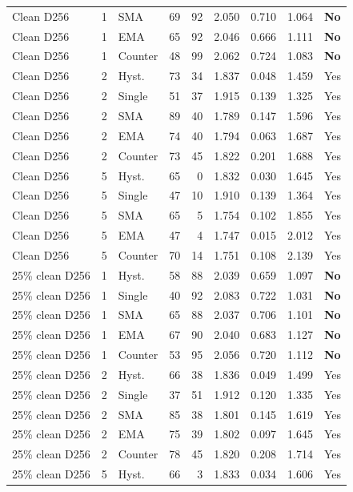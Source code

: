 {\begin{longtable}{lllrrrrrl}
Clean D256 & 1 & SMA & 69 & 92 & 2.050 & 0.710 & 1.064 & \textbf{No}\\
Clean D256 & 1 & EMA & 65 & 92 & 2.046 & 0.666 & 1.111 & \textbf{No}\\
Clean D256 & 1 & Counter & 48 & 99 & 2.062 & 0.724 & 1.083 & \textbf{No}\\
Clean D256 & 2 & Hyst. & 73 & 34 & 1.837 & 0.048 & 1.459 & Yes\\
Clean D256 & 2 & Single & 51 & 37 & 1.915 & 0.139 & 1.325 & Yes\\
Clean D256 & 2 & SMA & 89 & 40 & 1.789 & 0.147 & 1.596 & Yes\\
Clean D256 & 2 & EMA & 74 & 40 & 1.794 & 0.063 & 1.687 & Yes\\
Clean D256 & 2 & Counter & 73 & 45 & 1.822 & 0.201 & 1.688 & Yes\\
Clean D256 & 5 & Hyst. & 65 & 0 & 1.832 & 0.030 & 1.645 & Yes\\
Clean D256 & 5 & Single & 47 & 10 & 1.910 & 0.139 & 1.364 & Yes\\
Clean D256 & 5 & SMA & 65 & 5 & 1.754 & 0.102 & 1.855 & Yes\\
Clean D256 & 5 & EMA & 47 & 4 & 1.747 & 0.015 & 2.012 & Yes\\
Clean D256 & 5 & Counter & 70 & 14 & 1.751 & 0.108 & 2.139 & Yes\\
25\% clean D256 & 1 & Hyst. & 58 & 88 & 2.039 & 0.659 & 1.097 & \textbf{No}\\
25\% clean D256 & 1 & Single & 40 & 92 & 2.083 & 0.722 & 1.031 & \textbf{No}\\
25\% clean D256 & 1 & SMA & 65 & 88 & 2.037 & 0.706 & 1.101 & \textbf{No}\\
25\% clean D256 & 1 & EMA & 67 & 90 & 2.040 & 0.683 & 1.127 & \textbf{No}\\
25\% clean D256 & 1 & Counter & 53 & 95 & 2.056 & 0.720 & 1.112 & \textbf{No}\\
25\% clean D256 & 2 & Hyst. & 66 & 38 & 1.836 & 0.049 & 1.499 & Yes\\
25\% clean D256 & 2 & Single & 37 & 51 & 1.912 & 0.120 & 1.335 & Yes\\
25\% clean D256 & 2 & SMA & 85 & 38 & 1.801 & 0.145 & 1.619 & Yes\\
25\% clean D256 & 2 & EMA & 75 & 39 & 1.802 & 0.097 & 1.645 & Yes\\
25\% clean D256 & 2 & Counter & 78 & 45 & 1.820 & 0.208 & 1.714 & Yes\\
25\% clean D256 & 5 & Hyst. & 66 & 3 & 1.833 & 0.034 & 1.606 & Yes\\

\end{longtable}}
